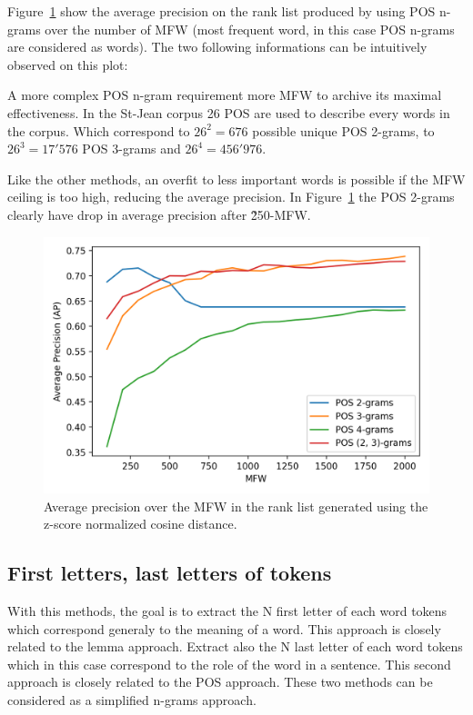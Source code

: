 Figure~\ref{fig:pos_ngrams} show the average precision on the rank list produced by using POS n-grams over the number of MFW (most frequent word, in this case POS n-grams are considered as words).
The two following informations can be intuitively observed on this plot:

A more complex POS n-gram requirement more MFW to archive its maximal effectiveness.
In the St-Jean corpus 26 POS are used to describe every words in the corpus.
Which correspond to $26^2 = 676$ possible unique POS 2-grams, to $26^3 = 17'576$ POS 3-grams and $26^4 = 456'976$.

Like the other methods, an overfit to less important words is possible if the MFW ceiling is too high, reducing the average precision.
In Figure~\ref{fig:pos_ngrams} the POS 2-grams clearly have drop in average precision after \~250-MFW.

\begin{figure}
  \includegraphics[width=\linewidth]{img/pos_ngrams.png}
  \caption{Average precision over the MFW in the rank list generated using the z-score normalized cosine distance.}
  \label{fig:pos_ngrams}
\end{figure}

\subsection{First letters, last letters of tokens}

With this methods, the goal is to extract the N first letter of each word tokens which correspond generaly to the meaning of a word.
This approach is closely related to the lemma approach.
Extract also the N last letter of each word tokens which in this case correspond to the role of the word in a sentence.
This second approach is closely related to the POS approach.
These two methods can be considered as a simplified n-grams approach.

